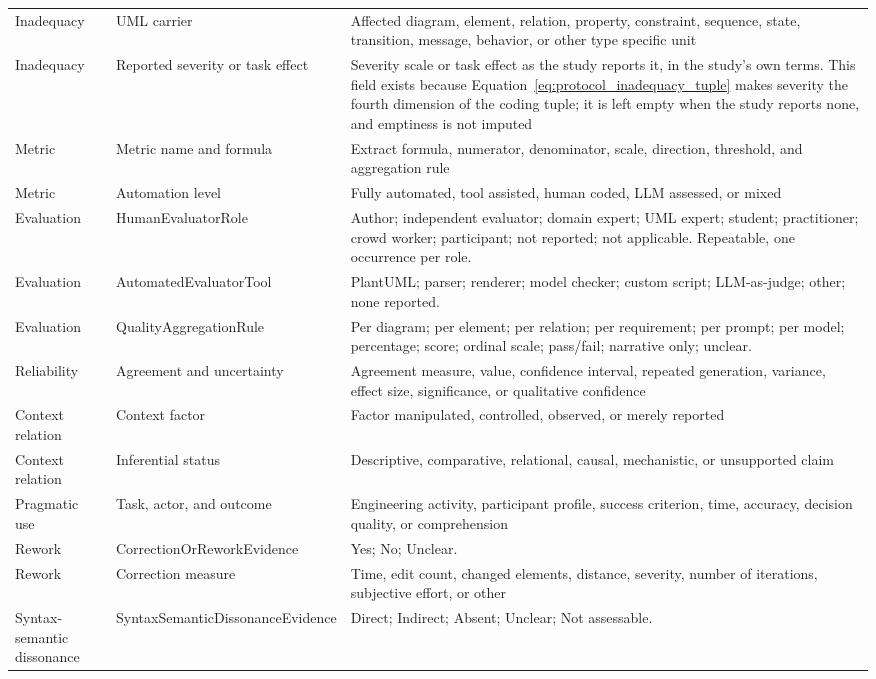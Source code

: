 \begin{longtable}{p{} p{} p{}}
Inadequacy & UML carrier & Affected diagram, element, relation, property, constraint, sequence, state, transition, message, behavior, or other type specific unit \\
Inadequacy & Reported severity or task effect & Severity scale or task effect as the study reports it, in the study's own terms. This field exists because Equation~\ref{eq:protocol_inadequacy_tuple} makes severity the fourth dimension of the coding tuple; it is left empty when the study reports none, and emptiness is not imputed \\
Metric & Metric name and formula & Extract formula, numerator, denominator, scale, direction, threshold, and aggregation rule \\
Metric & Automation level & Fully automated, tool assisted, human coded, LLM assessed, or mixed \\
Evaluation & HumanEvaluatorRole & Author; independent evaluator; domain expert; UML expert; student; practitioner; crowd worker; participant; not reported; not applicable. Repeatable, one occurrence per role. \\
Evaluation & AutomatedEvaluatorTool & PlantUML; parser; renderer; model checker; custom script; LLM-as-judge; other; none reported. \\
Evaluation & QualityAggregationRule & Per diagram; per element; per relation; per requirement; per prompt; per model; percentage; score; ordinal scale; pass/fail; narrative only; unclear. \\
Reliability & Agreement and uncertainty & Agreement measure, value, confidence interval, repeated generation, variance, effect size, significance, or qualitative confidence \\
Context relation & Context factor & Factor manipulated, controlled, observed, or merely reported \\
Context relation & Inferential status & Descriptive, comparative, relational, causal, mechanistic, or unsupported claim \\
Pragmatic use & Task, actor, and outcome & Engineering activity, participant profile, success criterion, time, accuracy, decision quality, or comprehension \\
Rework & CorrectionOrReworkEvidence & Yes; No; Unclear. \\
Rework & Correction measure & Time, edit count, changed elements, distance, severity, number of iterations, subjective effort, or other \\
Syntax-semantic dissonance & SyntaxSemanticDissonanceEvidence & Direct; Indirect; Absent; Unclear; Not assessable. \\

\end{longtable}
